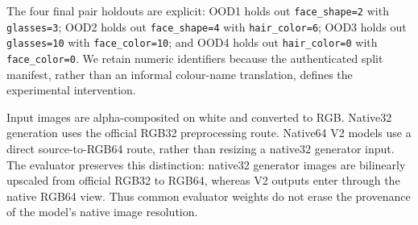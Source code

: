 The four final pair holdouts are explicit: OOD1 holds out \texttt{face\_shape=2} with \texttt{glasses=3}; OOD2 holds out \texttt{face\_shape=4} with \texttt{hair\_color=6}; OOD3 holds out \texttt{glasses=10} with \texttt{face\_color=10}; and OOD4 holds out \texttt{hair\_color=0} with \texttt{face\_color=0}. We retain numeric identifiers because the authenticated split manifest, rather than an informal colour-name translation, defines the experimental intervention.

Input images are alpha-composited on white and converted to RGB. Native32 generation uses the official RGB32 preprocessing route. Native64 V2 models use a direct source-to-RGB64 route, rather than resizing a native32 generator input. The evaluator preserves this distinction: native32 generator images are bilinearly upscaled from official RGB32 to RGB64, whereas V2 outputs enter through the native RGB64 view. Thus common evaluator weights do not erase the provenance of the model's native image resolution.
